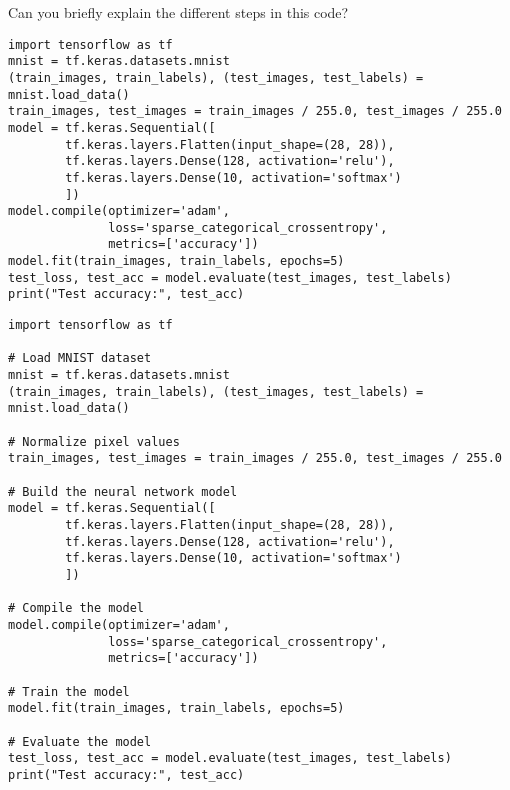 \documentclass[a4paper,11pt,addpoints]{exam}
\begin{document}
\begin{questions}
    \question[10] Can you briefly explain the different steps in this code? 

    \begin{lstlisting}
import tensorflow as tf
mnist = tf.keras.datasets.mnist
(train_images, train_labels), (test_images, test_labels) = mnist.load_data()
train_images, test_images = train_images / 255.0, test_images / 255.0
model = tf.keras.Sequential([
        tf.keras.layers.Flatten(input_shape=(28, 28)),
        tf.keras.layers.Dense(128, activation='relu'),
        tf.keras.layers.Dense(10, activation='softmax')
        ])
model.compile(optimizer='adam',
              loss='sparse_categorical_crossentropy',
              metrics=['accuracy'])
model.fit(train_images, train_labels, epochs=5)
test_loss, test_acc = model.evaluate(test_images, test_labels)
print("Test accuracy:", test_acc)
        \end{lstlisting}

        \begin{solution}[5in]

    \begin{lstlisting}[caption={TensorFlow Pseudocode for Simple Neural Network}, label={lst:tensorflow_pseudocode}]
import tensorflow as tf
        
# Load MNIST dataset
mnist = tf.keras.datasets.mnist
(train_images, train_labels), (test_images, test_labels) = mnist.load_data()
        
# Normalize pixel values
train_images, test_images = train_images / 255.0, test_images / 255.0
        
# Build the neural network model
model = tf.keras.Sequential([
        tf.keras.layers.Flatten(input_shape=(28, 28)),
        tf.keras.layers.Dense(128, activation='relu'),
        tf.keras.layers.Dense(10, activation='softmax')
        ])
        
# Compile the model
model.compile(optimizer='adam',
              loss='sparse_categorical_crossentropy',
              metrics=['accuracy'])
        
# Train the model
model.fit(train_images, train_labels, epochs=5)
        
# Evaluate the model
test_loss, test_acc = model.evaluate(test_images, test_labels)
print("Test accuracy:", test_acc)
        \end{lstlisting}
        \end{solution}
    \end{questions}
\end{document}
